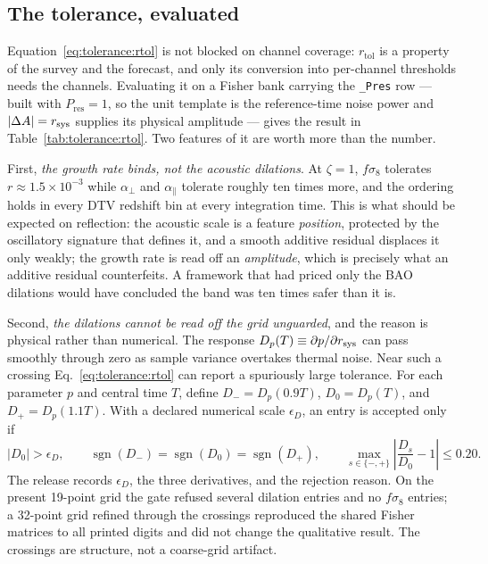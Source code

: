 \subsection*{The tolerance, evaluated}

Equation~\eqref{eq:tolerance:rtol} is not blocked on channel coverage: $r_{\text{tol}}$ is a property of the survey and the forecast, and only its conversion into per-channel thresholds needs the channels. Evaluating it on a Fisher bank carrying the \texttt{\_Pres} row --- built with $P_{\text{res}}=1$, so the unit template is the reference-time noise power and $|\Delta A|=r_{\rm sys}$ supplies its physical amplitude --- gives the result in Table~\ref{tab:tolerance:rtol}. Two features of it are worth more than the number.

First, \emph{the growth rate binds, not the acoustic dilations}. At $\zeta = 1$, $f\sigma_8$ tolerates $r \approx 1.5 \times 10^{-3}$ while $\alpha_\perp$ and $\alpha_\parallel$ tolerate roughly ten times more, and the ordering holds in every DTV redshift bin at every integration time. This is what should be expected on reflection: the acoustic scale is a feature \emph{position}, protected by the oscillatory signature that defines it, and a smooth additive residual displaces it only weakly; the growth rate is read off an \emph{amplitude}, which is precisely what an additive residual counterfeits. A framework that had priced only the BAO dilations would have concluded the band was ten times safer than it is.

Second, \emph{the dilations cannot be read off the grid unguarded}, and the reason is physical rather than numerical. The response $D_p(T)\equiv\partial p/\partial r_{\rm sys}$ can pass smoothly through zero as sample variance overtakes thermal noise.  Near such a crossing Eq.~\eqref{eq:tolerance:rtol} can report a spuriously large tolerance.  For each parameter $p$ and central time $T$, define $D_-=D_p(0.9T)$, $D_0=D_p(T)$, and $D_+=D_p(1.1T)$.  With a declared numerical scale $\epsilon_D$, an entry is accepted only if
\begin{equation}
\label{eq:tolerance:stability}
 |D_0|>\epsilon_D,\qquad
 \operatorname{sgn}(D_-)=\operatorname{sgn}(D_0)=\operatorname{sgn}(D_+),\qquad
 \max_{s\in\{-,+\}}\left|\frac{D_s}{D_0}-1\right|\le0.20.
\end{equation}
The release records $\epsilon_D$, the three derivatives, and the rejection reason.  On the present 19-point grid the gate refused several dilation entries and no $f\sigma_8$ entries; a 32-point grid refined through the crossings reproduced the shared Fisher matrices to all printed digits and did not change the qualitative result.  The crossings are structure, not a coarse-grid artifact.

